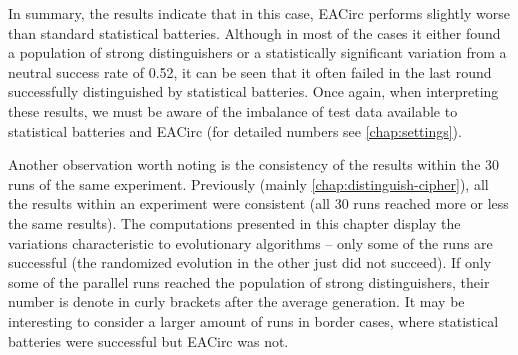 \documentclass[12pt,oneside]{fithesis2}		%
\renewcommand{\_}{\leavevmode \kern0.0em\vbox{\hrule width0.4em}}
\begin{document}
In summary, the results indicate that in this case, EACirc performs slightly worse than standard statistical batteries.
Although in most of the cases it either found a population of strong distinguishers or a statistically significant variation
from a neutral success rate of 0.52, it can be seen that it often failed in the last round successfully distinguished
by statistical batteries. Once again, when interpreting these results, we must be aware of the imbalance of test data
available to statistical batteries and EACirc (for detailed numbers see \autoref{chap:settings}).

Another observation worth noting is the consistency of the results within the 30 runs of the same experiment.
Previously (mainly \autoref{chap:distinguish-cipher}), all the results within an experiment were consistent 
(all 30 runs reached more or less the same results).
The computations presented in this chapter display the variations characteristic to evolutionary algorithms -- 
only some of the runs are successful (the randomized evolution in the other just did not succeed).
If only some of the parallel runs reached the population of strong distinguishers, their number is denote in curly brackets
after the average generation.
It may be interesting to consider a larger amount of runs in border cases, where statistical batteries were successful
but EACirc was not.
\vfill
\end{document}
